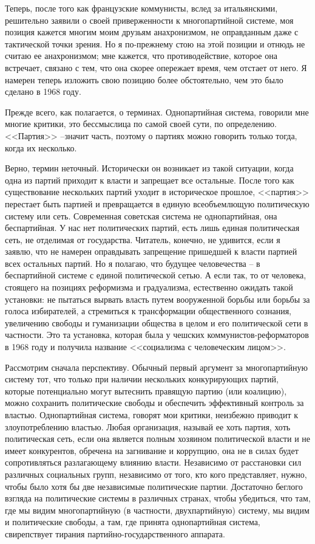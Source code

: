 \documentclass{book}
\begin{document}
Теперь, после того как французские коммунисты, вслед за итальянскими, решительно заявили о своей приверженности к многопартийной системе, моя позиция кажется многим моим друзьям анахронизмом, не оправданным даже с тактической точки зрения. Но я по-прежнему стою на этой позиции и отнюдь не считаю ее анахронизмом; мне кажется, что противодействие, которое она встречает, связано с тем, что она скорее опережает время, чем отстает от него. Я намерен теперь изложить свою позицию более обстоятельно, чем это было сделано в 1968 году.

Прежде всего, как полагается, о терминах. Однопартийная система, говорили мне многие критики, это бессмыслица по са­мой своей сути, по определению. <<Партия>> --значит часть,  по­этому о партиях можно говорить только тогда, когда их не­сколько.

Верно, термин неточный. Исторически он возникает из такой ситуации, когда одна из партий приходит к власти и запрещает все остальные. После того как существование нескольких пар­тий уходит в историческое прошлое, <<партия>> перестает быть партией и превращается в единую всеобъемлющую политиче­скую систему или сеть. Современная советская система не одно­партийная, она беспартийная.  У нас нет политических партий, есть лишь единая политическая сеть, не отделимая от государ­ства. Читатель, конечно, не удивится, если я заявлю, что не наме­рен оправдывать запрещение пришедшей к власти партией всех остальных партий. Но я полагаю, что будущее человечества -- в беспартийной системе с единой политической сетью. А если так, то от человека, стоящего на позициях реформизма и градуализма, естественно ожидать такой установки: не пытаться вырвать власть путем вооруженной борьбы или борьбы за го­лоса избирателей, а стремиться к трансформации общественно­го сознания, увеличению свободы и гуманизации общества в целом и его 
политической сети в частности. Это та установка, которая была у чешских коммунистов-реформаторов в 1968 го­ду и получила название <<социализма с человеческим лицом>>.

Рассмотрим сначала перспективу. Обычный первый аргумент за многопартийную систему тот, что только при наличии не­скольких конкурирующих партий, которые потенциально мо­гут вытеснить правящую партию (или коалицию), можно со­хранить политические свободы и обеспечить эффективный контроль за властью. Однопартийная система, говорят мои кри­тики, неизбежно приводит к злоупотреблению властью. Любая организация, называй ее хоть партия, хоть политическая сеть, если она является полным хозяином политической власти и не имеет конкурентов, обречена на загнивание и коррупцию, она не в силах будет сопротивляться разлагающему влиянию власти. Независимо от расстановки сил различных социальных групп, независимо от того, кто кого представляет, нужно, что­бы было хотя бы две независимые политические партии. До­статочно беглого взгляда на политические системы в различных странах, чтобы убедиться, что там, где мы видим многопартий­ную (в частности, двухпартийную) систему, мы видим и поли­тические свободы, а там, где принята 
однопартийная система, свирепствует тирания партийно-государственного аппарата.
\end{document}
